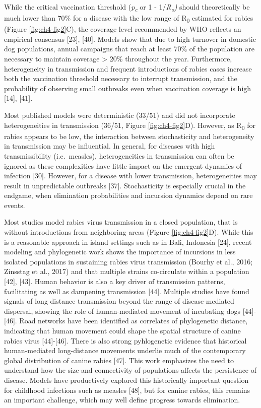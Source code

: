 \documentclass[
  oneside]{book}
\begin{document}
While the critical vaccination threshold (\emph{p\textsubscript{c}} or 1 - 1/\emph{R\textsubscript{o})} should
theoretically be much lower than 70\% for a disease with the low range of
R\textsubscript{0} estimated for rabies (Figure \ref{fig:ch4-fig2}C), the coverage level recommended
by WHO reflects an empirical consensus {[}23{]}, {[}40{]}. Models show that
due to high turnover in domestic dog populations, annual campaigns that
reach at least 70\% of the population are necessary to maintain coverage
\textgreater{} 20\% throughout the year. Furthermore, heterogeneity in transmission
and frequent introductions of rabies cases increase both the vaccination
threshold necessary to interrupt transmission, and the probability of
observing small outbreaks even when vaccination coverage is high {[}14{]},
{[}41{]}.

Most published models were deterministic (33/51) and did not incorporate
heterogeneities in transmission (36/51, Figure \ref{fig:ch4-fig2}D). However, as R\textsubscript{0}
for rabies appears to be low, the interaction between stochasticity and
heterogeneity in transmission may be influential. In general, for
diseases with high transmissibility (i.e.~measles), heterogeneities in
transmission can often be ignored as these complexities have little
impact on the emergent dynamics of infection {[}30{]}. However, for a
disease with lower transmission, heterogeneities may result in
unpredictable outbreaks {[}37{]}. Stochasticity is especially crucial in
the endgame, when elimination probabilities and incursion dynamics
depend on rare events.

Most studies model rabies virus transmission in a closed population,
that is without introductions from neighboring areas (Figure \ref{fig:ch4-fig2}D).
While this is a reasonable approach in island settings such as in Bali,
Indonesia {[}24{]}, recent modeling and phylogenetic work shows the
importance of incursions in less isolated populations in sustaining
rabies virus transmission (Bourhy et al., 2016; Zinsstag et al., 2017)
and that multiple strains co-circulate within a population {[}42{]},
{[}43{]}. Human behavior is also a key driver of transmission patterns,
facilitating as well as dampening transmission {[}44{]}. Multiple studies
have found signals of long distance transmission beyond the range of
disease-mediated dispersal, showing the role of human-mediated movement
of incubating dogs {[}44{]}-{[}46{]}. Road networks have been identified as
correlates of phylogenetic distance, indicating that human movement
could shape the spatial structure of canine rabies virus {[}44{]}-{[}46{]}.
There is also strong pyhlogenetic evidence that historical
human-mediated long-distance movements underlie much of the contemporary
global distribution of canine rabies {[}47{]}. This work emphasizes the
need to understand how the size and connectivity of populations affects
the persistence of disease. Models have productively explored this
historically important question for childhood infections such as measles
{[}48{]}, but for canine rabies, this remains an important challenge,
which may well define progress towards elimination.
\end{document}
